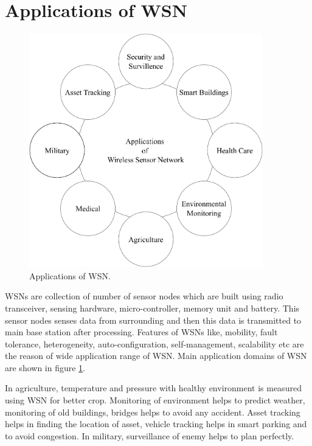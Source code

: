 \section{Applications of WSN}
\begin{figure}[htbp]
\center	
\includegraphics[width=4in, height=4in] {Figures/PDF/WSN-Applications.pdf}	
\caption{Applications of WSN.}
\label{WSN-Applications}	
\end{figure}
WSNs are collection of number of sensor nodes which are built using radio transceiver, sensing hardware, micro-controller, memory unit and battery. This sensor nodes senses data from surrounding and then this data is transmitted to main base station after processing. Features of WSNs like, mobility, fault tolerance, heterogeneity, auto-configuration, self-management, scalability etc are the reason of wide application range of WSN. Main application domains \cite{ramson2017applications} of WSN are shown in figure \ref{WSN-Applications}. 
\par In agriculture, temperature and pressure with healthy environment is measured using WSN for better crop. Monitoring of environment helps to predict weather, monitoring of old buildings, bridges helps to avoid any accident. Asset tracking helps in finding the location of asset, vehicle tracking  helps in smart parking and to avoid congestion. In military, surveillance of enemy helps to plan perfectly.

